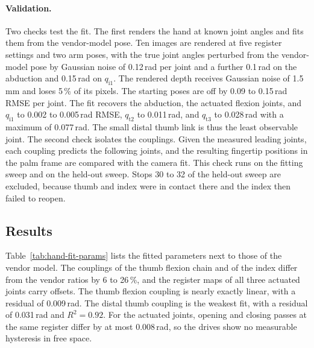 \paragraph{Validation.} Two checks test the fit. The first renders the hand at known joint angles and fits them from the vendor-model pose. Ten images are rendered at five register settings and two arm poses, with the true joint angles perturbed from the vendor-model pose by Gaussian noise of 0.12\,rad per joint and a further 0.1\,rad on the abduction and 0.15\,rad on $q_{\mathrm{i}1}$. The rendered depth receives Gaussian noise of 1.5\,mm and loses 5\,\% of its pixels. The starting poses are off by 0.09 to 0.15\,rad \acs{RMSE} per joint. The fit recovers the abduction, the actuated flexion joints, and $q_{\mathrm{i}1}$ to 0.002 to 0.005\,rad \acs{RMSE}, $q_{\mathrm{t}2}$ to 0.011\,rad, and $q_{\mathrm{t}3}$ to 0.028\,rad with a maximum of 0.077\,rad. The small distal thumb link is thus the least observable joint. The second check isolates the couplings. Given the measured leading joints, each coupling predicts the following joints, and the resulting fingertip positions in the palm frame are compared with the camera fit. This check runs on the fitting sweep and on the held-out sweep. Stops 30 to 32 of the held-out sweep are excluded, because thumb and index were in contact there and the index then failed to reopen.

\subsection{Results}

Table~\ref{tab:hand-fit-params} lists the fitted parameters next to those of the vendor model. The couplings of the thumb flexion chain and of the index differ from the vendor ratios by 6 to 26\,\%, and the register maps of all three actuated joints carry offsets. The thumb flexion coupling is nearly exactly linear, with a residual of 0.009\,rad. The distal thumb coupling is the weakest fit, with a residual of 0.031\,rad and $R^2=0.92$. For the actuated joints, opening and closing passes at the same register differ by at most 0.008\,rad, so the drives show no measurable hysteresis in free space.

